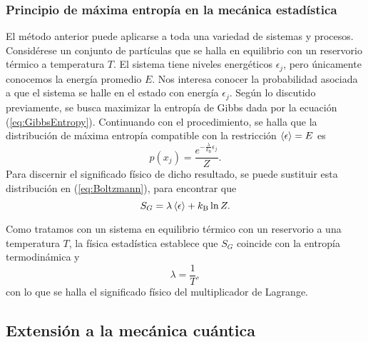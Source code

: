 \subsubsection{Principio de máxima entropía en la mecánica estadística}


El método anterior puede aplicarse a toda una variedad de sistemas y procesos. Considérese un conjunto de partículas que se halla en equilibrio con un reservorio térmico a temperatura $T$. El sistema tiene niveles energéticos $\epsilon_{j}$, pero únicamente conocemos la energía promedio $E$. Nos interesa conocer la probabilidad asociada a que el sistema se halle en el estado con energía $\epsilon_{j}$. Según lo discutido previamente, se busca maximizar la entropía de Gibbs dada por la ecuación (\ref{eq:GibbsEntropy}). Continuando con el procedimiento, se halla que la distribución de máxima entropía compatible con la restricción $\expval{\epsilon}=E$ es
\begin{equation}\label{eq:Boltzmann}
    p(x_{j})=\frac{e^{-\frac{\lambda}{k_{\text{B}}}\epsilon_{j}}}{Z}.
\end{equation}
Para discernir el significado físico de dicho resultado, se puede sustituir esta distribución en (\ref{eq:Boltzmann}), para encontrar que
\begin{equation}
    S_{G}=\lambda\expval{\epsilon}+k_{\text{B}}\ln{Z}.
\end{equation}

Como tratamos con un sistema en equilibrio térmico con un reservorio a una temperatura $T$, la física estadística establece que $S_{G}$ coincide con la entropía termodinámica y
\begin{equation}
    \lambda=\frac{1}{T},\nonumber
\end{equation}
con lo que se halla el significado físico del multiplicador de Lagrange. \cite{Greiner}

\subsection{Extensión a la mecánica cuántica}



